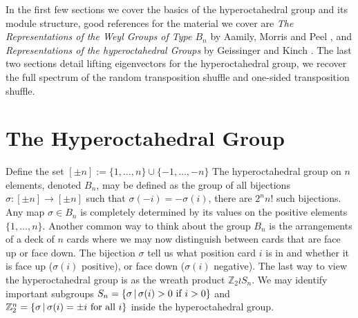 \documentclass[11pt]{report}
\begin{document}
In the first few sections we cover the basics of the hyperoctahedral group and its module structure, good references for the material we cover are \emph{The Representations of the Weyl Groups of Type $B_{n}$} by Aamily, Morris and Peel \cite{al1981representations}, and \emph{Representations of the hyperoctahedral Groups} by Geissinger and Kinch \cite{geissinger1978representations}. The last two sections detail lifting eigenvectors for the hyperoctahedral group, we recover the full spectrum of the random transposition shuffle and one-sided transposition shuffle. 





\section{The Hyperoctahedral Group}
\label{chpt6:subsec:hyper}
Define the set $[\pm n ]:= \{1,\ldots, n\} \cup \{-1,\ldots, -n\}$
The hyperoctahedral group on $n$ elements, denoted $B_{n}$, may be defined as the group of all bijections $\sigma: [\pm n] \to [\pm n]$ such that $\sigma(-i) = - \sigma(i)$, there are $2^{n} n!$ such bijections. Any map $\sigma \in B_{n}$ is completely determined by its values on the positive elements $\{1,\ldots, n\}$. Another common way to think about the group $B_{n}$ is the arrangements of a deck of $n$ cards where we may now distinguish between cards that are face up or face down. The bijection $\sigma$ tell us what position card $i$ is in and whether it is face up ($\sigma(i)$ positive), or face down ($\sigma(i)$ negative). The last way to view the hyperoctahedral group is as the wreath product $\mathbb{Z}_{2} \wr S_{n}$. We may identify important subgroups $S_{n} = \{\sigma \, | \, \sigma(i) >0 \textnormal{ if $i > 0$}\}$ and $\mathbb{Z}_{2}^{n} = \{\sigma \, | \, \sigma(i) = \pm i \textnormal{ for all $i$}\}$ inside the hyperoctahedral group. 
\end{document}
